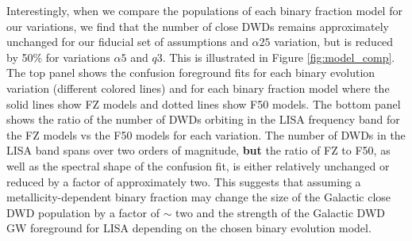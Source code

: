 \documentclass[twocolumn]{aastex631}
\begin{document}
Interestingly, when we compare the populations of each binary fraction model for our variations, we find that the number of close DWDs remains approximately unchanged for our fiducial set of assumptions and $\alpha25$ variation, but is reduced by 50\% for variations $\alpha5$ and $q3$. This is illustrated in Figure \ref{fig:model_comp}. The top panel shows the confusion foreground fits for each binary evolution variation (different colored lines) and for each binary fraction model where the solid lines show FZ models and dotted lines show F50 models. The bottom panel shows the ratio of the number of DWDs orbiting in the LISA frequency band for the FZ models vs the F50 models for each variation. The number of DWDs in the LISA band spans over two orders of magnitude, \textbf{but} the ratio of FZ to F50, as well as the spectral shape of the confusion fit, is either relatively unchanged or reduced by a factor of approximately two. This suggests that assuming a metallicity-dependent binary fraction may change the size of the Galactic close DWD population by a factor of $\sim$ two and the strength of the Galactic DWD GW foreground for LISA depending on the chosen binary evolution model.
\end{document}
